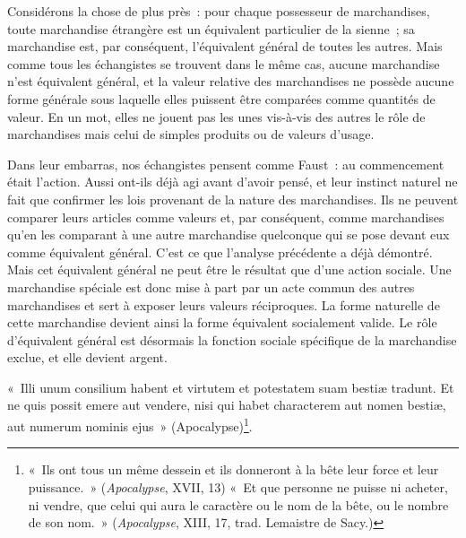 \documentclass[french,twoside]{book} %
\newenvironment{quoteblock}%
  {\begin{quoting}}
  {\end{quoting}}
\newenvironment{quotebar}{%
    \def\FrameCommand{{\color{rubric!10!}\vrule width 0.5em} \hspace{0.9em}}%
    \def\OuterFrameSep{\itemsep} %
    \MakeFramed {\advance\hsize-\width \FrameRestore}
  }%
  {%
    \endMakeFramed
  }
\renewenvironment{quoteblock}%
  {%
    \savenotes
    \setstretch{0.9}
    \normalfont
    \begin{quotebar}
  }
  {%
    \end{quotebar}
    \spewnotes
  }
\begin{document}
Considérons la chose de plus près : pour chaque possesseur de marchandises, toute marchandise étrangère est un équivalent particulier de la sienne ; sa marchandise est, par conséquent, l’équivalent général de toutes les autres. Mais comme tous les échangistes se trouvent dans le même cas, aucune marchandise n’est équivalent général, et la valeur relative des marchandises ne possède aucune forme générale sous laquelle elles puissent être comparées comme quantités de valeur. En un mot, elles ne jouent pas les unes vis-à-vis des autres le rôle de marchandises mais celui de simples produits ou de valeurs d’usage.\par
Dans leur embarras, nos échangistes pensent comme Faust : au commencement était l’action. Aussi ont-ils déjà agi avant d’avoir pensé, et leur instinct naturel ne fait que confirmer les lois provenant de la nature des marchandises. Ils ne peuvent comparer leurs articles comme valeurs et, par conséquent, comme marchandises qu’en les comparant à une autre marchandise quelconque qui se pose devant eux comme équivalent général. C’est ce que l’analyse précédente a déjà démontré. Mais cet équivalent général ne peut être le résultat que d’une action sociale. Une marchandise spéciale est donc mise à part par un acte commun des autres marchandises et sert à exposer leurs valeurs réciproques. La forme naturelle de cette marchandise devient ainsi la forme équivalent socialement valide. Le rôle d’équivalent général est désormais la fonction sociale spécifique de la marchandise exclue, et elle devient argent.\par

\begin{quoteblock}
 \noindent « Illi unum consilium habent et virtutem et potestatem suam bestiæ tradunt. Et ne quis possit emere aut vendere, nisi qui habet characterem aut nomen bestiæ, aut numerum nominis ejus » (Apocalypse)\footnote{« Ils ont tous un même dessein et ils donneront à la bête leur force et leur puissance. » (\emph{Apocalypse}, XVII, 13) « Et que personne ne puisse ni acheter, ni vendre, que celui qui aura le caractère ou le nom de la bête, ou le nombre de son nom. » (\emph{Apocalypse}, XIII, 17, trad. Lemaistre de Sacy.)}.
\end{quoteblock}
\end{document}
